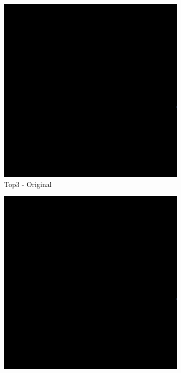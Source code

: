 \begin{figure}[H]
\begin{subfigure}{0.32\textwidth}
    \includegraphics[width=\textwidth]{02-main//figures/ch4/kfold_ensembles/unetplusplus_tu-efficientnetv2_rw_s.ra2_in1k/worst_cases/worst_2_iou0.000_24951112_tile_4_13_2bd653_original.png}
    \caption{Top3 - Original}
\end{subfigure}
\hfill
\begin{subfigure}{0.32\textwidth}
    \includegraphics[width=\textwidth]{02-main//figures/ch4/kfold_ensembles/unetplusplus_tu-efficientnetv2_rw_s.ra2_in1k/worst_cases/worst_2_iou0.000_24951112_tile_4_13_2bd653_overlay_gt.png}

\end{subfigure}
\end{figure}
